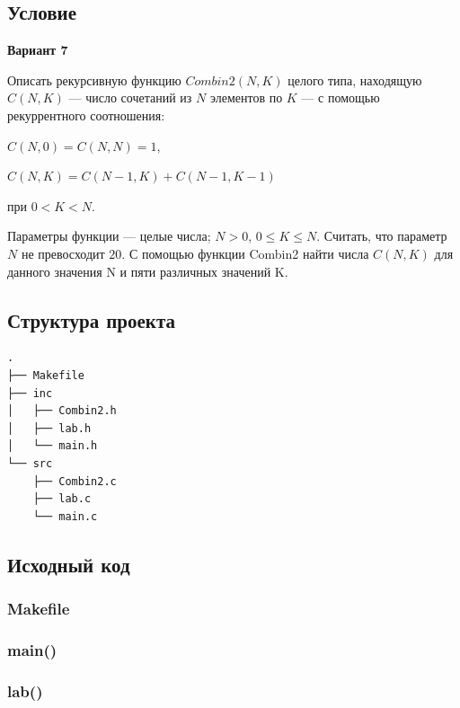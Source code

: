 \documentclass[12pt, a4paper]{article}
\begin{document}
\subsection{Условие}

\begin{center}
    \textbf{Вариант 7}
\end{center}

Описать рекурсивную функцию $Combin2(N, K)$ целого типа, находящую $C(N, K)$ — число сочетаний из $N$ элементов по $K$ — с помощью рекуррентного соотношения:

$C(N, 0) = C(N, N) = 1$,

$C(N, K) = C(N - 1, K) + C(N - 1, K - 1)$

при $0 < K < N$.

Параметры функции — целые числа; $N > 0$, $0 \leq K \leq N$. Считать, что параметр $N$ не превосходит $20$. С помощью функции Combin2 найти числа $C(N, K)$ для данного значения N и пяти различных значений K.

\subsection{Структура проекта}

\begin{verbatim}
.
├── Makefile
├── inc
│   ├── Combin2.h
│   ├── lab.h
│   └── main.h
└── src
    ├── Combin2.c
    ├── lab.c
    └── main.c
\end{verbatim}

\subsection{Исходный код}

\subsubsection{Makefile}


\subsubsection{main()}



\subsubsection{lab()}


\end{document}
